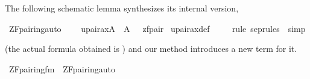The following schematic lemma synthesizes its internal version,
\begin{isabelle}
\isamarkupfalse%
\ ZF{\isacharunderscore}pairing{\isacharunderscore}auto{\isacharcolon}\isanewline
\ \ \ \ {\isachardoublequoteopen}upair{\isacharunderscore}ax{\isacharparenleft}{\isacharhash}{\isacharhash}A{\isacharparenright}\ {\isasymlongleftrightarrow}\ {\isacharparenleft}A{\isacharcomma}\ {\isacharbrackleft}{\isacharbrackright}\ {\isasymTurnstile}\ {\isacharquery}zfpair{\isacharparenright}{\isachardoublequoteclose}\isanewline
{}\isamarkupfalse%
\ upair{\isacharunderscore}ax{\isacharunderscore}def\ \isanewline
\ \ \isamarkupfalse%
\ {\isacharparenleft}{\isacharparenleft}rule\ sep{\isacharunderscore}rules\ {\isacharbar}\ simp{\isacharparenright}{\isacharplus}{\isacharparenright}
\end{isabelle}
(the actual formula obtained is
) and
our  method introduces a new term
 for it.
\begin{isabelle}
\isamarkupfalse%
\ {\isachardoublequoteopen}ZF{\isacharunderscore}pairing{\isacharunderscore}fm{\isachardoublequoteclose}\ \ {\isachardoublequoteopen}ZF{\isacharunderscore}pairing{\isacharunderscore}auto{\isachardoublequoteclose}%
\end{isabelle}


